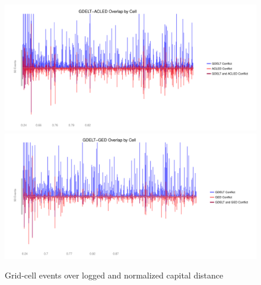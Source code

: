 \documentclass[hidelinks]{article}
\begin{document}
\begin{figure}[!htbp]
\includegraphics[width = 1 \textwidth]{spaceACLEDa2.pdf}\\
\includegraphics[width = 1 \textwidth]{spaceGEDa2.pdf}
\caption{Grid-cell events over logged and normalized capital distance}\label{fig:correlations_space}
\end{figure}
\newpage
\end{document}

